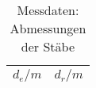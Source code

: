 \begin{table}[h]
  \centering
  \caption{Messdaten: Abmessungen der Stäbe}
  \label{tab:tabBreiten}
  \begin{tabular}{c c}
    \toprule
     $d_{e}/m$	&  $d_{r}/m$	 \\
    \midrule
      
    \bottomrule
  \end{tabular}
\end{table}
